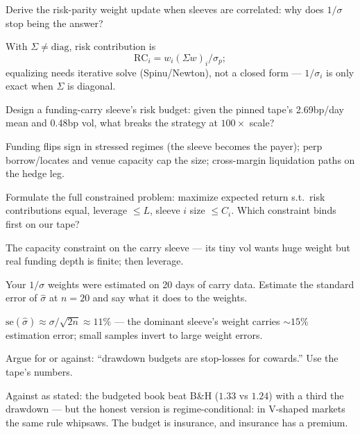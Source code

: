 \begin{exercise}[hard]
Derive the risk-parity weight update when sleeves are correlated:
why does $1/\sigma$ stop being the answer?
\end{exercise}
\begin{solution}
With $\Sigma\ne\mathrm{diag}$, risk contribution is
\[ \mathrm{RC}_i = w_i(\Sigma w)_i/\sigma_p ; \]
equalizing needs iterative solve (Spinu/Newton), not a closed form ---
$1/\sigma_i$ is only exact when $\Sigma$ is diagonal.
\end{solution}

\begin{exercise}[hard]
Design a funding-carry sleeve's risk budget: given the pinned
tape's 2.69bp/day mean and 0.48bp vol, what breaks the strategy
at $100\times$ scale?
\end{exercise}
\begin{solution}
Funding flips sign in stressed regimes (the sleeve becomes the
payer); perp borrow/locates and venue capacity cap the size;
cross-margin liquidation paths on the hedge leg.
\end{solution}

\begin{exercise}[hard]
Formulate the full constrained problem: maximize expected return
s.t.\ risk contributions equal, leverage $\le L$, sleeve $i$
size $\le C_i$. Which constraint binds first on our tape?
\end{exercise}
\begin{solution}
The capacity constraint on the carry sleeve --- its tiny vol
wants huge weight but real funding depth is finite; then leverage.
\end{solution}

\begin{exercise}[hard]
Your $1/\sigma$ weights were estimated on 20 days of carry data.
Estimate the standard error of $\hat\sigma$ at $n=20$ and say what
it does to the weights.
\end{exercise}
\begin{solution}
$\mathrm{se}(\hat\sigma)\approx\sigma/\sqrt{2n}\approx11\%$ ---
the dominant sleeve's weight carries $\sim$$15\%$ estimation
error; small samples invert to large weight errors.
\end{solution}

\begin{exercise}[hard]
Argue for or against: ``drawdown budgets are stop-losses for
cowards.'' Use the tape's numbers.
\end{exercise}
\begin{solution}
Against as stated: the budgeted book beat B\&H ($1.33$ vs $1.24$)
with a third the drawdown --- but the honest version is
regime-conditional: in V-shaped markets the same rule whipsaws.
The budget is insurance, and insurance has a premium.
\end{solution}

